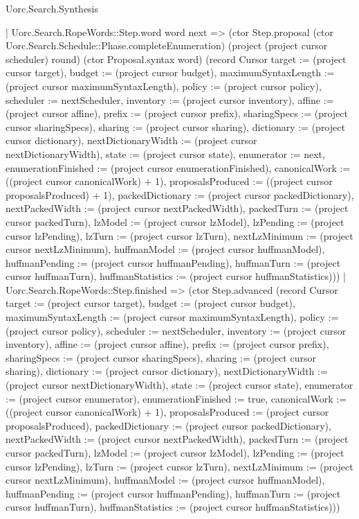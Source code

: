 \begin{lexlean}{Uorc.Search.Synthesis}
\begin{semanticmodule}
{        | Uorc.Search.RopeWords::Step.word word next => (ctor Step.proposal (ctor Uorc.Search.Schedule::Phase.completeEnumeration) (project (project cursor scheduler) round) (ctor Proposal.syntax word) (record Cursor {target := (project cursor target), budget := (project cursor budget), maximumSyntaxLength := (project cursor maximumSyntaxLength), policy := (project cursor policy), scheduler := nextScheduler, inventory := (project cursor inventory), affine := (project cursor affine), prefix := (project cursor prefix), sharingSpecs := (project cursor sharingSpecs), sharing := (project cursor sharing), dictionary := (project cursor dictionary), nextDictionaryWidth := (project cursor nextDictionaryWidth), state := (project cursor state), enumerator := next, enumerationFinished := (project cursor enumerationFinished), canonicalWork := ((project cursor canonicalWork) + 1), proposalsProduced := ((project cursor proposalsProduced) + 1), packedDictionary := (project cursor packedDictionary), nextPackedWidth := (project cursor nextPackedWidth), packedTurn := (project cursor packedTurn), lzModel := (project cursor lzModel), lzPending := (project cursor lzPending), lzTurn := (project cursor lzTurn), nextLzMinimum := (project cursor nextLzMinimum), huffmanModel := (project cursor huffmanModel), huffmanPending := (project cursor huffmanPending), huffmanTurn := (project cursor huffmanTurn), huffmanStatistics := (project cursor huffmanStatistics)}))
        | Uorc.Search.RopeWords::Step.finished => (ctor Step.advanced (record Cursor {target := (project cursor target), budget := (project cursor budget), maximumSyntaxLength := (project cursor maximumSyntaxLength), policy := (project cursor policy), scheduler := nextScheduler, inventory := (project cursor inventory), affine := (project cursor affine), prefix := (project cursor prefix), sharingSpecs := (project cursor sharingSpecs), sharing := (project cursor sharing), dictionary := (project cursor dictionary), nextDictionaryWidth := (project cursor nextDictionaryWidth), state := (project cursor state), enumerator := (project cursor enumerator), enumerationFinished := true, canonicalWork := ((project cursor canonicalWork) + 1), proposalsProduced := (project cursor proposalsProduced), packedDictionary := (project cursor packedDictionary), nextPackedWidth := (project cursor nextPackedWidth), packedTurn := (project cursor packedTurn), lzModel := (project cursor lzModel), lzPending := (project cursor lzPending), lzTurn := (project cursor lzTurn), nextLzMinimum := (project cursor nextLzMinimum), huffmanModel := (project cursor huffmanModel), huffmanPending := (project cursor huffmanPending), huffmanTurn := (project cursor huffmanTurn), huffmanStatistics := (project cursor huffmanStatistics)}))
}
\end{semanticmodule}
\end{lexlean}
